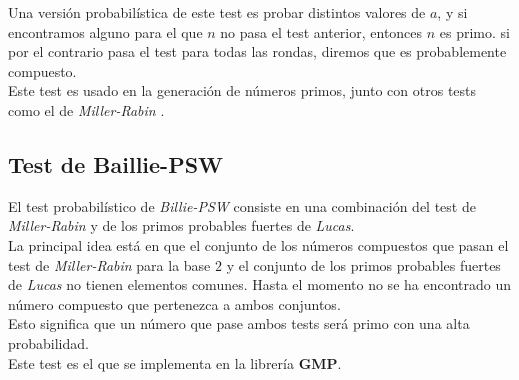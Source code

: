 Una versión probabilística de este test es probar distintos valores de $a$, y si encontramos alguno para el que $n$ no pasa el test anterior, entonces $n$ es primo. si por el contrario pasa el test para todas las rondas, diremos que es probablemente compuesto.\\

Este test es usado en la generación de números primos, junto con otros tests como el de \textit{Miller-Rabin} \cite{digital_signature_standard}.

\subsection{Test de Baillie-PSW}

El test probabilístico de \textit{Billie-PSW} consiste en una combinación del test de \textit{Miller-Rabin} y de los primos probables fuertes de \textit{Lucas}.\\

La principal idea está en que el conjunto de los números compuestos que pasan el test de \textit{Miller-Rabin} para la base $2$ y el conjunto de los primos probables fuertes de \textit{Lucas} no tienen elementos comunes. Hasta el momento no se ha encontrado un número compuesto que pertenezca a ambos conjuntos.\\

Esto significa que un número que pase ambos tests será primo con una alta probabilidad.\\

Este test es el que se implementa en la librería \textbf{GMP}.

\endinput
